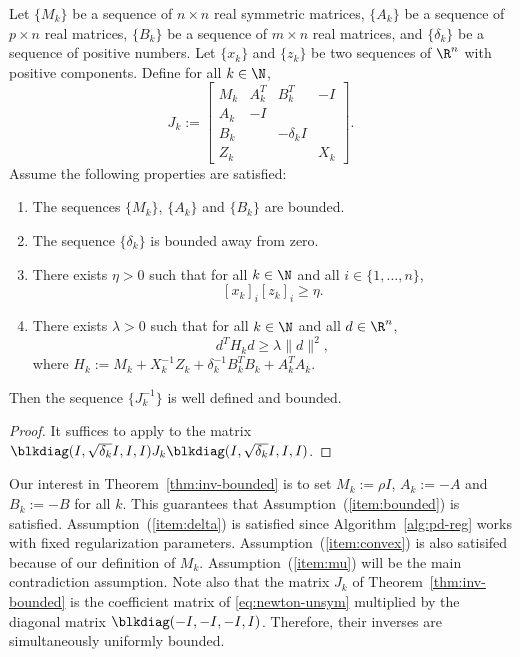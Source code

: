 \documentclass{amsart}
\begin{document}
\begin{btheorem}
  \label{thm:inv-bounded}
  Let $\{M_k\}$ be a sequence of $n \times n$ real symmetric matrices,
  $\{A_k\}$ be a sequence of $p \times n$ real matrices, $\{B_k\}$ be a
  sequence of $m \times n$ real matrices, and $\{\delta_k\}$ be a sequence of
  positive numbers. Let $\{x_k\}$ and $\{z_k\}$ be two sequences of $\R^n$ with
  positive components. Define for all $k \in \N$,
  \[
    J_k :=
    \begin{bmatrix}
      M_k & A_k^T & B_k^T       & -I \\
      A_k & -I    &             & \\
      B_k &       & -\delta_k I & \\
      Z_k &       &             & X_k
    \end{bmatrix}.
  \]
  Assume the following properties are satisfied:
  \begin{enumerate}
    \item \label{item:bounded}
      The sequences $\{M_k\}$, $\{A_k\}$ and $\{B_k\}$ are bounded.
    \item \label{item:delta}
      The sequence $\{\delta_k\}$ is bounded away from zero.
    \item \label{item:mu}
      There exists $\eta > 0$ such that for all $k \in \N$ and all $i
      \in \{1, \ldots, n\}$,
      \begin{equation}
        \label{eq:contradiction}
        [x_k]_i [z_k]_i \geq \eta.
      \end{equation}
    \item \label{item:convex}
      There exists $\lambda > 0$ such that for all $k \in \N$ and all $d
      \in \R^n$,
      \[
        d^T H_k d \geq \lambda \|d\|^2,
      \]
      where $H_k := M_k + X_k^{-1} Z_k + \delta_k^{-1} B_k^T B_k + A_k^T A_k$.
  \end{enumerate}
  Then the sequence $\{J_k^{-1}\}$ is well defined and bounded.
\end{btheorem}

\begin{proof}
  It suffices to apply \cite[Theorem~$1$]{armand-benoist-2011} to the matrix
  $\blkdiag(I, \sqrt{\delta_k} I, I, I) J_k \blkdiag(I, \sqrt{\delta_k} I, I,
  I)$.
\end{proof}

Our interest in Theorem~\ref{thm:inv-bounded} is to set $M_k := \rho I$, $A_k :=
-A$ and $B_k := -B$ for all $k$. This guarantees that
Assumption~(\ref{item:bounded}) is satisfied. Assumption~(\ref{item:delta}) is
satisfied since Algorithm~\ref{alg:pd-reg} works with fixed regularization
parameters. Assumption~(\ref{item:convex}) is also satisifed because of our
definition of $M_k$. Assumption~(\ref{item:mu}) will be the main contradiction
assumption. Note also that the matrix $J_k$ of Theorem~\ref{thm:inv-bounded} is
the coefficient matrix of \eqref{eq:newton-unsym} multiplied by the diagonal
matrix $\blkdiag(-I, -I, -I, I)$. Therefore, their inverses are simultaneously
uniformly bounded.
\end{document}
